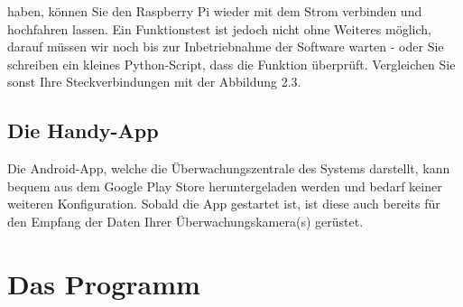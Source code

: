 \documentclass[12pt,a4paper]{scrreprt}
\begin{document}
haben, können Sie den Raspberry Pi wieder mit dem Strom verbinden und hochfahren lassen. Ein Funktionstest ist jedoch nicht ohne Weiteres möglich, darauf müssen wir noch bis zur Inbetriebnahme der Software warten - oder Sie schreiben ein kleines Python-Script, dass die Funktion überprüft. Vergleichen Sie sonst Ihre Steckverbindungen mit der Abbildung 2.3.

\section{Die Handy-App}
Die Android-App, welche die Überwachungszentrale des Systems darstellt, kann bequem aus dem Google Play Store heruntergeladen werden und bedarf keiner weiteren Konfiguration. Sobald die App gestartet ist, ist diese auch bereits für den Empfang der Daten Ihrer Überwachungskamera(s) gerüstet.

\chapter{Das Programm}
\end{document}
